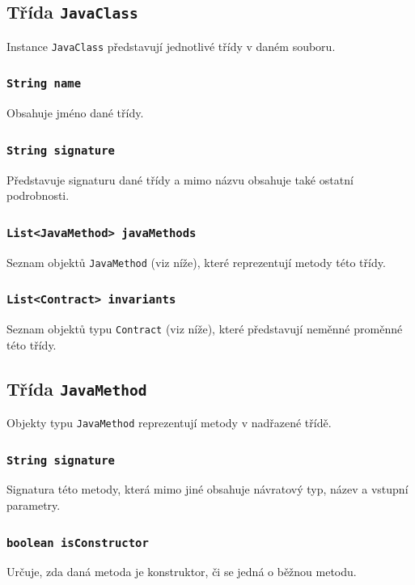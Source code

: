			\subsection{Třída \texttt{JavaClass}}
				Instance \texttt{JavaClass} představují jednotlivé třídy v daném souboru.
				
				\subsubsection{\texttt{String name}}				
					Obsahuje jméno dané třídy.
			
				\subsubsection{\texttt{String signature}}				
					Představuje signaturu dané třídy a mimo názvu obsahuje také ostatní podrobnosti.
					
				\subsubsection{\texttt{List<JavaMethod> javaMethods}}
					Seznam objektů \texttt{JavaMethod} (viz níže), které reprezentují metody této třídy.
					
				\subsubsection{\texttt{List<Contract> invariants}}
					Seznam objektů typu \texttt{Contract} (viz níže), které představují neměnné proměnné této třídy.
			
			
			\subsection{Třída \texttt{JavaMethod}}
				Objekty typu \texttt{JavaMethod} reprezentují metody v nadřazené třídě.
				
				\subsubsection{\texttt{String signature}}
					Signatura této metody, která mimo jiné obsahuje návratový typ, název a vstupní parametry.
					
				\subsubsection{\texttt{boolean isConstructor}}
					Určuje, zda daná metoda je konstruktor, či se jedná o běžnou metodu.
					
